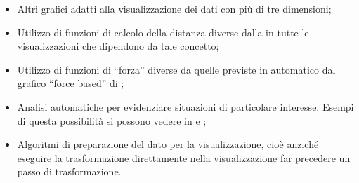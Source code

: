 \begin{itemize}
	\item Altri grafici adatti alla visualizzazione dei dati con più di tre dimensioni;
	\item Utilizzo di funzioni di calcolo della distanza diverse dalla  in tutte le
visualizzazioni che dipendono da tale concetto;
	\item Utilizzo di funzioni di “forza” diverse da quelle previste in automatico dal grafico “force
based” di ;
	\item Analisi automatiche per evidenziare situazioni di particolare interesse. Esempi di questa
possibilità si possono vedere in  e ;
	\item Algoritmi di preparazione del dato per la visualizzazione, cioè anziché eseguire la
trasformazione direttamente nella visualizzazione far precedere un passo di trasformazione.
\end{itemize}